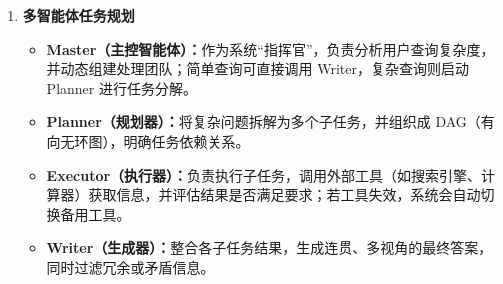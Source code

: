 \documentclass[../main.tex]{subfiles}
\begin{document}
\begin{enumerate}
\begin{itemize}
        \end{itemize}
    \item \textbf{多智能体任务规划}
        \begin{itemize}
        \item \textbf{Master（主控智能体）：}作为系统“指挥官”，负责分析用户查询复杂度，并动态组建处理团队；简单查询可直接调用 Writer，复杂查询则启动 Planner 进行任务分解。
        \item \textbf{Planner（规划器）：}将复杂问题拆解为多个子任务，并组织成 DAG（有向无环图），明确任务依赖关系。
        \item \textbf{Executor（执行器）：}负责执行子任务，调用外部工具（如搜索引擎、计算器）获取信息，并评估结果是否满足要求；若工具失效，系统会自动切换备用工具。
        \item \textbf{Writer（生成器）：}整合各子任务结果，生成连贯、多视角的最终答案，同时过滤冗余或矛盾信息。
    \end{itemize}
\end{enumerate}
\end{document}
